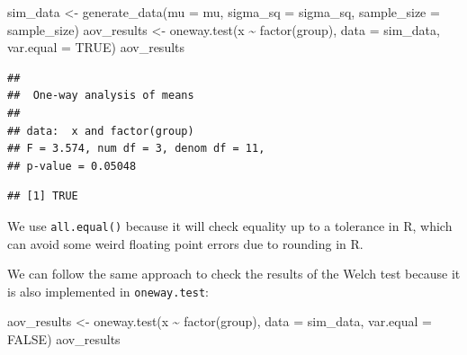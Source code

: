 \documentclass[
]{book}
\newenvironment{Shaded}{\begin{snugshade}}{\end{snugshade}}
\newcommand{\AttributeTok}[1]{\textcolor[rgb]{0.77,0.63,0.00}{#1}}
\newcommand{\ConstantTok}[1]{\textcolor[rgb]{0.00,0.00,0.00}{#1}}
\newcommand{\FunctionTok}[1]{\textcolor[rgb]{0.00,0.00,0.00}{#1}}
\newcommand{\NormalTok}[1]{#1}
\newcommand{\OtherTok}[1]{\textcolor[rgb]{0.56,0.35,0.01}{#1}}
\newcommand{\SpecialCharTok}[1]{\textcolor[rgb]{0.00,0.00,0.00}{#1}}
\begin{document}
\begin{Shaded}
\begin{Highlighting}[]
\NormalTok{sim\_data }\OtherTok{\textless{}{-}} \FunctionTok{generate\_data}\NormalTok{(}\AttributeTok{mu =}\NormalTok{ mu, }\AttributeTok{sigma\_sq =}\NormalTok{ sigma\_sq,}
                          \AttributeTok{sample\_size =}\NormalTok{ sample\_size)}
\NormalTok{aov\_results }\OtherTok{\textless{}{-}} \FunctionTok{oneway.test}\NormalTok{(x }\SpecialCharTok{\textasciitilde{}} \FunctionTok{factor}\NormalTok{(group), }\AttributeTok{data =}\NormalTok{ sim\_data, }
                           \AttributeTok{var.equal =} \ConstantTok{TRUE}\NormalTok{)}
\NormalTok{aov\_results}
\end{Highlighting}
\end{Shaded}

\begin{verbatim}
## 
##  One-way analysis of means
## 
## data:  x and factor(group)
## F = 3.574, num df = 3, denom df = 11,
## p-value = 0.05048
\end{verbatim}

\begin{Shaded}
\end{Shaded}

\begin{verbatim}
## [1] TRUE
\end{verbatim}

We use \texttt{all.equal()} because it will check equality up to a tolerance in R, which can avoid some weird floating point errors due to rounding in R.

We can follow the same approach to check the results of the Welch test because it is also implemented in \texttt{oneway.test}:

\begin{Shaded}
\begin{Highlighting}[]
\NormalTok{aov\_results }\OtherTok{\textless{}{-}} \FunctionTok{oneway.test}\NormalTok{(x }\SpecialCharTok{\textasciitilde{}} \FunctionTok{factor}\NormalTok{(group),}
                           \AttributeTok{data =}\NormalTok{ sim\_data, }
                           \AttributeTok{var.equal =} \ConstantTok{FALSE}\NormalTok{)}
\NormalTok{aov\_results}
\end{Highlighting}
\end{Shaded}
\end{document}
